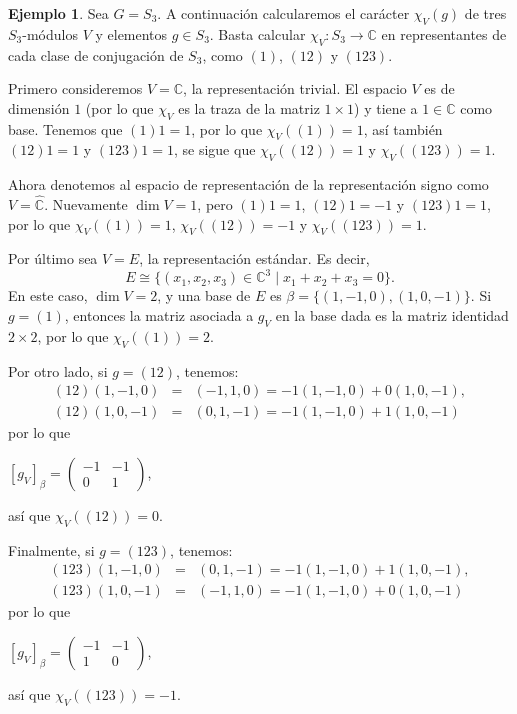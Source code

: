 \documentclass[12pt]{book}
\theoremstyle{definition}
\newtheorem{example}[theorem]{Ejemplo}
\newcounter{in}
\begin{document}
\begin{example}
  \label{caracteres-S3}
  Sea $G=S_{3}$. A continuación calcularemos el
  carácter $\chi_{V}(g)$ de tres $S_{3}$-módulos $V$ y elementos
  $g\in S_{3}$. Basta calcular $\chi_{V}:S_{3}\rightarrow\mathbb{C}$
  en representantes de cada clase de conjugación de $S_{3}$, como $(1)$,
  $(12)$ y $(123)$.
  
  Primero consideremos $V=\mathbb{C}$, la representación trivial. El
  espacio $V$ es de dimensión $1$ (por lo que $\chi_{V}$ es la traza de
  la matriz $1\times 1$) y tiene a $1\in \mathbb{C}$ como
  base. Tenemos que $(1)1=1$, por lo que $\chi_{V}((1))=1$, así también
  $(12)1=1$ y $(123)1=1$, se sigue que $\chi_{V}((12))=1$ y
  $\chi_{V}((123))=1$.

  Ahora denotemos al espacio de representación de la representación
  signo como $V=\mathbb{\hat C}$. Nuevamente
  $\dim V=1$, pero $(1)1=1$, $(12)1=-1$ y $(123)1=1$, por lo que
  $\chi_{V}((1))=1$,  $\chi_{V}((12))=-1$ y  $\chi_{V}((123))=1$.

  Por último sea $V=E$, la representación estándar. Es decir,
  \begin{equation*}
    E\cong\{(x_{1},x_{2},x_{3})\in \mathbb{C}^{3}\mid x_{1}+x_{2}+x_{3}=0\}.
  \end{equation*}
  En este caso, $\dim V=2$, y una base de $E$ es
  $\beta=\{(1,-1,0),(1,0,-1)\}$. Si $g=(1)$, entonces la matriz
  asociada a $g_{V}$ en la base dada es la matriz identidad $2\times
  2$, por lo que $\chi_{V}((1))=2$.
  
  Por otro lado, si $g=(12)$, tenemos:
  \begin{eqnarray*}
    (12)(1,-1,0)&=&(-1,1,0)=-1(1,-1,0)+0(1,0,-1),\\
    (12)(1,0,-1)&=&(0,1,-1)=-1(1,-1,0)+1(1,0,-1)
  \end{eqnarray*} 
  por lo que 
  \begin{center}
  $[g_{V}]_{\beta}=
  \begin{pmatrix}
    -1 & -1 \\
    0 & 1 
  \end{pmatrix}$,
\end{center}
así que $\chi_{V}((12))=0$.

Finalmente, si $g=(123)$, tenemos:
\begin{eqnarray*}
  (123)(1,-1,0)&=&(0,1,-1)=-1(1,-1,0)+1(1,0,-1),\\
  (123)(1,0,-1)&=&(-1,1,0)=-1(1,-1,0)+0(1,0,-1)
\end{eqnarray*} 
por lo que 
\begin{center}
  $[g_{V}]_{\beta}=
  \begin{pmatrix}
    -1 & -1 \\
    1 & 0 
  \end{pmatrix}$,
\end{center}
así que $\chi_{V}((123))=-1$.


\end{example}
\end{document}
